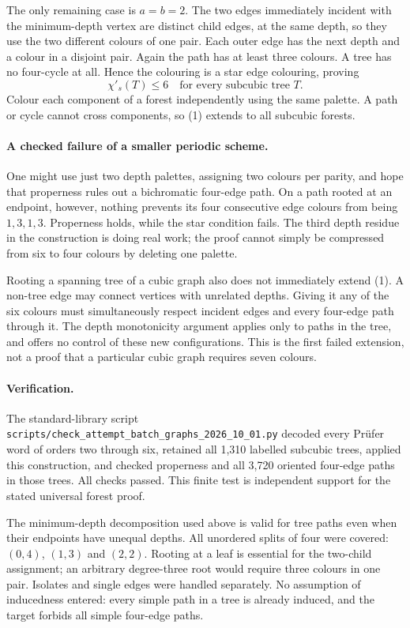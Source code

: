 \documentclass[11pt,a4paper]{article}
\begin{document}
The only remaining case is $a=b=2$. The two edges immediately incident with the minimum-depth vertex are distinct child edges, at the same depth, so they use the two different colours of one pair. Each outer edge has the next depth and a colour in a disjoint pair. Again the path has at least three colours. A tree has no four-cycle at all. Hence the colouring is a star edge colouring, proving
\[
 \chi'_s(T)\le6\quad\text{for every subcubic tree }T. \tag{1}
\]
Colour each component of a forest independently using the same palette. A path or cycle cannot cross components, so (1) extends to all subcubic forests.

\paragraph{A checked failure of a smaller periodic scheme.}
One might use just two depth palettes, assigning two colours per parity, and hope that properness rules out a bichromatic four-edge path. On a path rooted at an endpoint, however, nothing prevents its four consecutive edge colours from being $1,3,1,3$. Properness holds, while the star condition fails. The third depth residue in the construction is doing real work; the proof cannot simply be compressed from six to four colours by deleting one palette.

Rooting a spanning tree of a cubic graph also does not immediately extend (1). A non-tree edge may connect vertices with unrelated depths. Giving it any of the six colours must simultaneously respect incident edges and every four-edge path through it. The depth monotonicity argument applies only to paths in the tree, and offers no control of these new configurations. This is the first failed extension, not a proof that a particular cubic graph requires seven colours.

\paragraph{Verification.}
The standard-library script \texttt{scripts/check\_attempt\_batch\_graphs\_2026\_10\_01.py} decoded every Prüfer word of orders two through six, retained all 1,310 labelled subcubic trees, applied this construction, and checked properness and all 3,720 oriented four-edge paths in those trees. All checks passed. This finite test is independent support for the stated universal forest proof.

The minimum-depth decomposition used above is valid for tree paths even when their endpoints have unequal depths. All unordered splits of four were covered: $(0,4)$, $(1,3)$ and $(2,2)$. Rooting at a leaf is essential for the two-child assignment; an arbitrary degree-three root would require three colours in one pair. Isolates and single edges were handled separately. No assumption of inducedness entered: every simple path in a tree is already induced, and the target forbids all simple four-edge paths.
\end{document}
